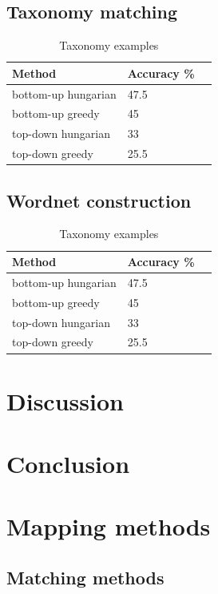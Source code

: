 \documentclass[11pt,a4paper]{article}
\begin{document}
\subsection{Taxonomy matching}
	\begin{table}[!htbp]
	\small
	\caption{Taxonomy examples}
	\label{table-taxonomies-results}		
	\centering
	\begin{tabular}{|l|l|l|}
	\hline
	{Method} & {Accuracy \%} \\ \hline
	bottom-up hungarian & 47.5 \\ \hline
	bottom-up greedy & 45 \\ \hline
	top-down hungarian & 33 \\ \hline
	top-down greedy & 25.5 \\
	\hline
	\end{tabular}
\end{table}
\subsection{Wordnet construction}
	\begin{table}[!htbp]
	\small
	\caption{Taxonomy examples}
	\label{table-taxonomies-results}		
	\centering
	\begin{tabular}{|l|l|l|}
		\hline
		{Method} & {Accuracy \%} \\ \hline
		bottom-up hungarian & 47.5 \\ \hline
		bottom-up greedy & 45 \\ \hline
		top-down hungarian & 33 \\ \hline
		top-down greedy & 25.5 \\
		\hline
	\end{tabular}
\end{table}
\section{Discussion}
\section{Conclusion}

\section{Mapping methods}



\subsection{Matching methods}
\end{document}

